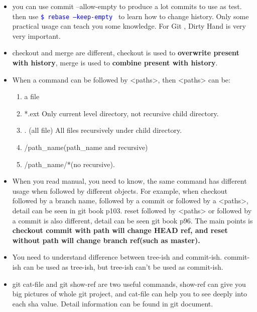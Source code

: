 \documentclass[a4paper,11pt,twoside]{book}
\newcommand{\linuxcommand}[1]{\texttt{\textcolor{blue}{\$ #1 \Pisymbol{psy}{191}}}}
\begin{document}
\begin{itemize}
\item you can use commit --allow-empty to produce a lot commits to use as test. then use \linuxcommand{rebase --keep-empty } to learn how to change history. Only some practical usage can teach you some knowledge. For Git , Dirty Hand is very very important.
        
        \item checkout and merge are different, checkout is used to \textbf{overwrite present with history}, merge is used to \textbf{combine present with history}.  

         \item When a command can be followed by <paths>, then <paths> can be:
				 \begin{enumerate}
						 \item a file 
							\item *.ext  Only current level directory, not recursive child directory.
							\item . (all file) All files recursively under child directory.
							\item /path\_name(path\_name and recursive) 
							\item /path\_name/*(no recursive). 
					\end{enumerate}
			\item When you read manual, you need to know, the same command has different usage when followed by different objects. For example, when checkout followed by a branch name, followed by a commit or followed by a <paths>, detail can be seen in git book p103.  reset followed by <paths> or followed by a commit is also different, detail can be seen git book p96. The main points is \textbf{checkout commit with path will change HEAD ref, and reset without path will change branch ref(such as master).}
         
         \item You need to understand difference between tree-ish and commit-ish. commit-ish can be used as tree-ish, but tree-ish can't be used as commit-ish. 
		 \item git cat-file and git show-ref are two useful commands, show-ref can give you big pictures of whole git project, and cat-file can help you to see deeply into each sha value. Detail information can be found in git document.                 
\end{itemize}
\end{document}
